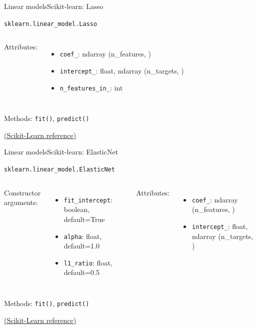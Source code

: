 \documentclass[10pt,compress]{beamer} %
\begin{document}
{\begin{frame}{Linear models}{Scikit-learn: Lasso}
\begin{exampleblock}{\texttt{sklearn.linear\_model.Lasso}}
\begin{columns}[T]
                Attributes:
                \begin{itemize}
                    \item \texttt{coef\_}:  ndarray (n\_features, )
                    \item \texttt{intercept\_}:  float, ndarray (n\_targets, )
                    \item \texttt{n\_features\_in\_}: int
                \end{itemize}
            \end{columns}

            \medskip

            Methods: \texttt{fit()}, \texttt{predict()}
        \end{exampleblock}

        \medskip
        \centering \href{https://scikit-learn.org/stable/modules/generated/sklearn.linear_model.Lasso.html}{(Scikit-Learn reference)}
    \end{frame}

    \begin{frame}{Linear models}{Scikit-learn: ElasticNet}
        \begin{exampleblock}{\texttt{sklearn.linear\_model.ElasticNet}}
         \medskip

         \begin{columns}[T]
                Constructor arguments:
                \begin{itemize}
                    \item \texttt{fit\_intercept}: boolean, default=True
                    \item \texttt{alpha}: float, default=1.0
                    \item \texttt{l1\_ratio}: float, default=0.5
                \end{itemize}

                Attributes:
                \begin{itemize}
                    \item \texttt{coef\_}:  ndarray (n\_features, )
                    \item \texttt{intercept\_}:  float, ndarray (n\_targets, )
                \end{itemize}
            \end{columns}

            \medskip

            Methods: \texttt{fit()}, \texttt{predict()}
        \end{exampleblock}

        \medskip
        \centering \href{https://scikit-learn.org/stable/modules/generated/sklearn.linear_model.ElasticNet.html}{(Scikit-Learn reference)}
    \end{frame}
}{}
\end{document}
